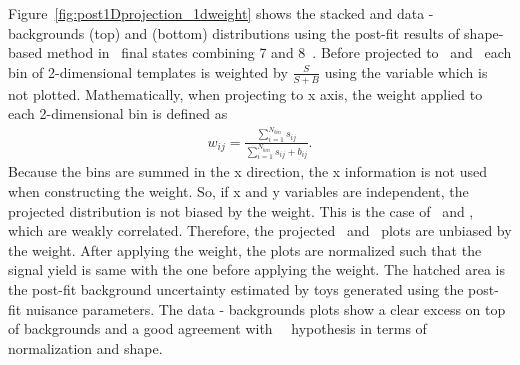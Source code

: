 Figure~\ref{fig:post1Dprojection_1dweight} shows the stacked and data - backgrounds  
\mT(top) and \mll(bottom) distributions using the post-fit results of 
shape-based method in \DF\ final states combining 7 and 8~\TeV.
Before projected to \mll\ and \mT\, each bin of 2-dimensional templates 
is weighted by $\frac{S}{S+B}$ using the variable which is not plotted. 
Mathematically, when projecting to x axis,
the weight applied to each 2-dimensional bin is defined as 
\begin{eqnarray} 
w_{ij} 
= 
\frac{\displaystyle \sum_{i=1}^{N_{bin}} s_{ij}}
     {\displaystyle \sum_{i=1}^{N_{bin}} s_{ij} + b_{ij}}.   
\end{eqnarray}
Because the bins are summed in the x direction, 
the x information is not used when constructing the weight. 
So, if x and y variables are independent, the projected 
distribution is not biased by the weight.  
This is the case of \mll\ and \mT, which are weakly correlated.
Therefore, the projected \mll\ and \mT\ plots are 
unbiased by the weight.
After applying the weight, the plots are normalized such that 
the signal yield is same with the one before applying the weight.
The hatched area is the post-fit background uncertainty 
estimated by toys generated using the post-fit nuisance parameters.  
The data - backgrounds plots show a clear excess on top of backgrounds 
and a good agreement with ~\GeV\ 
hypothesis in terms of normalization and shape. 


